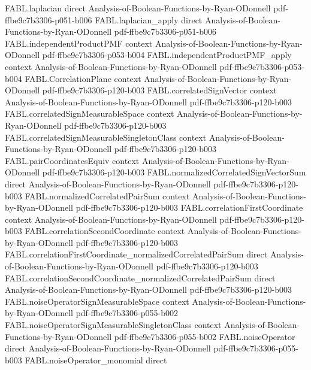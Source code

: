 \begin{theorem}
  {FABL.laplacian}
  {direct}
  {Analysis-of-Boolean-Functions-by-Ryan-ODonnell}
  {pdf-ffbe9c7b3306-p051-b006}
\proofstep
  {FABL.laplacian_apply}
  {direct}
  {Analysis-of-Boolean-Functions-by-Ryan-ODonnell}
  {pdf-ffbe9c7b3306-p051-b006}
\proofstep
  {FABL.independentProductPMF}
  {context}
  {Analysis-of-Boolean-Functions-by-Ryan-ODonnell}
  {pdf-ffbe9c7b3306-p053-b004}
\proofstep
  {FABL.independentProductPMF_apply}
  {context}
  {Analysis-of-Boolean-Functions-by-Ryan-ODonnell}
  {pdf-ffbe9c7b3306-p053-b004}
\proofstep
  {FABL.CorrelationPlane}
  {context}
  {Analysis-of-Boolean-Functions-by-Ryan-ODonnell}
  {pdf-ffbe9c7b3306-p120-b003}
\proofstep
  {FABL.correlatedSignVector}
  {context}
  {Analysis-of-Boolean-Functions-by-Ryan-ODonnell}
  {pdf-ffbe9c7b3306-p120-b003}
\proofstep
  {FABL.correlatedSignMeasurableSpace}
  {context}
  {Analysis-of-Boolean-Functions-by-Ryan-ODonnell}
  {pdf-ffbe9c7b3306-p120-b003}
\proofstep
  {FABL.correlatedSignMeasurableSingletonClass}
  {context}
  {Analysis-of-Boolean-Functions-by-Ryan-ODonnell}
  {pdf-ffbe9c7b3306-p120-b003}
\proofstep
  {FABL.pairCoordinatesEquiv}
  {context}
  {Analysis-of-Boolean-Functions-by-Ryan-ODonnell}
  {pdf-ffbe9c7b3306-p120-b003}
\proofstep
  {FABL.normalizedCorrelatedSignVectorSum}
  {direct}
  {Analysis-of-Boolean-Functions-by-Ryan-ODonnell}
  {pdf-ffbe9c7b3306-p120-b003}
\proofstep
  {FABL.normalizedCorrelatedPairSum}
  {context}
  {Analysis-of-Boolean-Functions-by-Ryan-ODonnell}
  {pdf-ffbe9c7b3306-p120-b003}
\proofstep
  {FABL.correlationFirstCoordinate}
  {context}
  {Analysis-of-Boolean-Functions-by-Ryan-ODonnell}
  {pdf-ffbe9c7b3306-p120-b003}
\proofstep
  {FABL.correlationSecondCoordinate}
  {context}
  {Analysis-of-Boolean-Functions-by-Ryan-ODonnell}
  {pdf-ffbe9c7b3306-p120-b003}
\proofstep
  {FABL.correlationFirstCoordinate_normalizedCorrelatedPairSum}
  {direct}
  {Analysis-of-Boolean-Functions-by-Ryan-ODonnell}
  {pdf-ffbe9c7b3306-p120-b003}
\proofstep
  {FABL.correlationSecondCoordinate_normalizedCorrelatedPairSum}
  {direct}
  {Analysis-of-Boolean-Functions-by-Ryan-ODonnell}
  {pdf-ffbe9c7b3306-p120-b003}
\proofstep
  {FABL.noiseOperatorSignMeasurableSpace}
  {context}
  {Analysis-of-Boolean-Functions-by-Ryan-ODonnell}
  {pdf-ffbe9c7b3306-p055-b002}
\proofstep
  {FABL.noiseOperatorSignMeasurableSingletonClass}
  {context}
  {Analysis-of-Boolean-Functions-by-Ryan-ODonnell}
  {pdf-ffbe9c7b3306-p055-b002}
\proofstep
  {FABL.noiseOperator}
  {direct}
  {Analysis-of-Boolean-Functions-by-Ryan-ODonnell}
  {pdf-ffbe9c7b3306-p055-b003}
\proofstep
  {FABL.noiseOperator_monomial}
  {direct}

\end{theorem}

